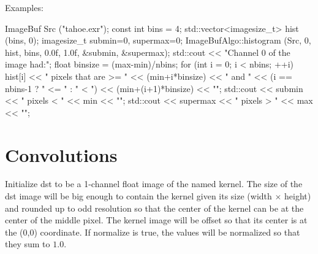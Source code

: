 \smallskip
\noindent Examples:
\begin{code}
    ImageBuf Src ("tahoe.exr");
    const int bins = 4;
    std::vector<imagesize_t> hist (bins, 0);
    imagesize_t submin=0, supermax=0;
    ImageBufAlgo::histogram (Src, 0, hist, bins, 0.0f, 1.0f,
                             &submin, &supermax);
    std::cout << "Channel 0 of the image had:\n";
    float binsize = (max-min)/nbins;
    for (int i = 0;  i < nbins;  ++i)
        hist[i] << " pixels that are >= " << (min+i*binsize) << " and "
                << (i == nbins-1 ? " <= " : " < ")
                << (min+(i+1)*binsize) << "\n";
    std::cout << submin << " pixels < " << min << "\n";
    std::cout << supermax << " pixels > " << max << "\n";
\end{code}
\apiend

\section{Convolutions}
\label{sec:iba:convolutions}

 
Initialize {\cf dst} to be a 1-channel {\cf float} image of the named kernel.
The size of the {\cf dst} image will be big enough to contain the kernel
given its size ({\cf width} $\times$ {\cf height})
and rounded up to odd resolution so
that the center of the kernel can be at the center of the middle
pixel.  The kernel image will be offset so that its center is at the
{\cf (0,0)} coordinate.  If {\cf normalize} is true, the values will be
normalized so that they sum to $1.0$.

